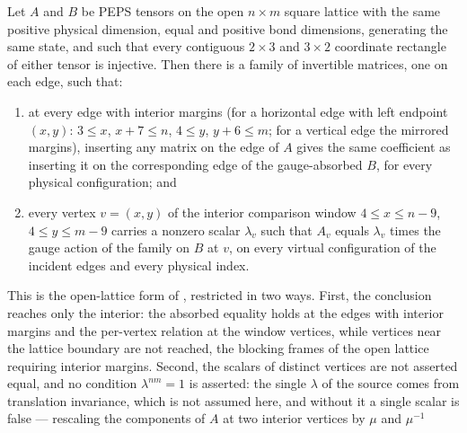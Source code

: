 \begin{theorem}%
    \label{thm:fundamentalTheorem_normalSquarePEPS_unconditional}
    \leanok
    Let $A$ and $B$ be PEPS tensors on the open $n\times m$ square lattice
    with the same positive physical dimension, equal and positive bond
    dimensions, generating the same state, and such that every contiguous
    $2\times 3$ and $3\times 2$ coordinate rectangle of either tensor is
    injective.  Then there is a family of invertible matrices, one on each
    edge, such that:
    \begin{enumerate}
        \item at every edge with interior margins (for a horizontal edge with
              left endpoint $(x,y)$: $3\le x$, $x+7\le n$, $4\le y$,
              $y+6\le m$; for a vertical edge the mirrored margins), inserting
              any matrix on the edge of $A$ gives the same coefficient as
              inserting it on the corresponding edge of the gauge-absorbed $B$,
              for every physical configuration; and
        \item every vertex $v=(x,y)$ of the interior comparison window
              $4\le x\le n-9$, $4\le y\le m-9$ carries a nonzero scalar
              $\lambda_v$ such that $A_v$ equals $\lambda_v$ times the gauge
              action of the family on $B$ at $v$, on every virtual configuration
              of the incident edges and every physical index.
    \end{enumerate}
    This is the open-lattice form of \cite[Theorem~3]{Molnar2018NormalPEPS},
    restricted in two ways. First, the conclusion reaches only the interior:
    the absorbed equality holds at the edges with interior margins and the
    per-vertex relation at the window vertices, while vertices near the
    lattice boundary are not reached, the blocking frames of the open lattice
    requiring interior margins. Second, the scalars of distinct vertices are
    not asserted equal, and no condition $\lambda^{nm}=1$ is asserted: the
    single $\lambda$ of the source comes from translation invariance, which is
    not assumed here, and without it a single scalar is false --- rescaling
    the components of $A$ at two interior vertices by $\mu$ and $\mu^{-1}$

\end{theorem}
